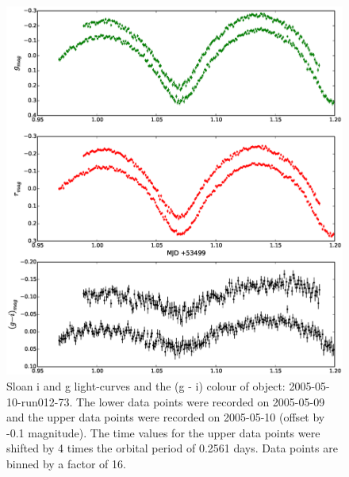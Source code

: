    \begin{figure}
     \center
     \includegraphics[width=120mm]{images/2005-05-10-run012-phasedlc.eps} 
     \caption{Sloan i and g light-curves and the (g - i) colour of object: 2005-05-10-run012-73. The lower data points were recorded on 2005-05-09 and the upper data points were recorded on 2005-05-10 (offset by -0.1 magnitude). The time values for the upper data points were shifted by 4 times the orbital period of 0.2561 days. Data points are binned by a factor of 16. }
     \label{fig:2005-05-10-run012}
   \end{figure}

  
